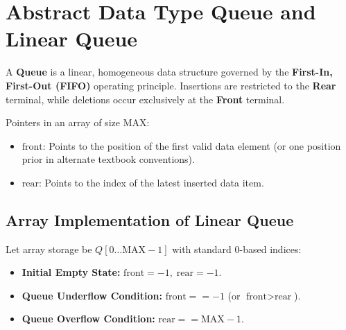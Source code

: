 \documentclass[12pt,a4paper]{article}
\begin{document}
\section{Abstract Data Type Queue and Linear Queue}

\begin{tcolorbox}[defbox, title={\textbf{Definition: Queue Abstract Data Type (ADT)}}]
A \textbf{Queue} is a linear, homogeneous data structure governed by the \textbf{First-In, First-Out (FIFO)} operating principle. Insertions are restricted to the \textbf{Rear} terminal, while deletions occur exclusively at the \textbf{Front} terminal.
\par\vspace{4pt}
Pointers in an array of size $\text{MAX}$:
\begin{itemize}[leftmargin=*, nosep]
  \item $\text{front}$: Points to the position of the first valid data element (or one position prior in alternate textbook conventions).
  \item $\text{rear}$: Points to the index of the latest inserted data item.
\end{itemize}
\end{tcolorbox}

\subsection{Array Implementation of Linear Queue}
Let array storage be $Q[0 \dots \text{MAX}-1]$ with standard $0$-based indices:
\begin{itemize}[leftmargin=*, itemsep=2pt]
  \item \textbf{Initial Empty State:} $\text{front} = -1, \; \text{rear} = -1$.
  \item \textbf{Queue Underflow Condition:} $\text{front} == -1$ (or $\text{front} > \text{rear}$).
  \item \textbf{Queue Overflow Condition:} $\text{rear} == \text{MAX} - 1$.
\end{itemize}
\end{document}
